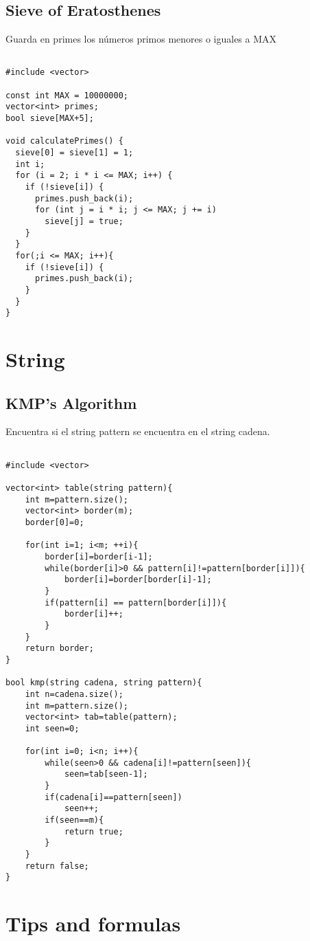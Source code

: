 \documentclass[11pt,letterpaper,twocolumn,twosided]{article}
\begin{document}
\subsection{Sieve of Eratosthenes}
Guarda en primes los n\'umeros primos menores o iguales a MAX
\begin{lstlisting}

#include <vector>

const int MAX = 10000000;
vector<int> primes;
bool sieve[MAX+5];

void calculatePrimes() {
  sieve[0] = sieve[1] = 1;
  int i;
  for (i = 2; i * i <= MAX; i++) {
    if (!sieve[i]) {
      primes.push_back(i);
      for (int j = i * i; j <= MAX; j += i)
        sieve[j] = true;
    }
  }
  for(;i <= MAX; i++){
  	if (!sieve[i]) {
      primes.push_back(i);
  	}
  }
}
\end{lstlisting}

\section{String}

\subsection{KMP's Algorithm}
Encuentra si el string pattern se encuentra en el string cadena.
\begin{lstlisting}

#include <vector>

vector<int> table(string pattern){
	int m=pattern.size();
	vector<int> border(m);
	border[0]=0;

	for(int i=1; i<m; ++i){
		border[i]=border[i-1];
		while(border[i]>0 && pattern[i]!=pattern[border[i]]){
			border[i]=border[border[i]-1];
		}
		if(pattern[i] == pattern[border[i]]){
			border[i]++;
		}
	}
	return border;
}

bool kmp(string cadena, string pattern){
	int n=cadena.size();
	int m=pattern.size();
	vector<int> tab=table(pattern);
	int seen=0;

	for(int i=0; i<n; i++){
		while(seen>0 && cadena[i]!=pattern[seen]){
			seen=tab[seen-1];
		}
		if(cadena[i]==pattern[seen])
			seen++;
		if(seen==m){
			return true;
		}
	}
	return false;
}
\end{lstlisting}

\section{Tips and formulas}
\end{document}
